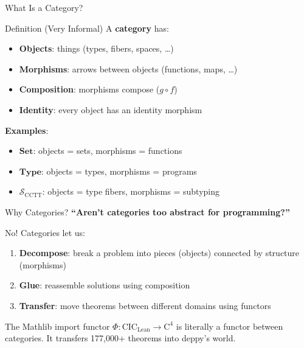 \documentclass[aspectratio=169,11pt]{beamer}
\newcommand{\Cfour}{\mathrm{C}^4}
\newcommand{\CIC}{\mathrm{CIC}}
\newcommand{\site}{\mathcal{S}}
\begin{document}
\begin{frame}{What Is a Category?}
\begin{block}{Definition (Very Informal)}
A \textbf{category} has:
\begin{itemize}
\item \textbf{Objects}: things (types, fibers, spaces, \ldots)
\item \textbf{Morphisms}: arrows between objects (functions, maps, \ldots)
\item \textbf{Composition}: morphisms compose ($g \circ f$)
\item \textbf{Identity}: every object has an identity morphism
\end{itemize}
\end{block}

\vspace{0.5em}
\textbf{Examples}:
\begin{itemize}
\item $\mathbf{Set}$: objects = sets, morphisms = functions
\item $\mathbf{Type}$: objects = types, morphisms = programs
\item $\site_{\mathrm{CCTT}}$: objects = type fibers, morphisms = subtyping
\end{itemize}
\end{frame}

\begin{frame}{Why Categories?}
\textbf{``Aren't categories too abstract for programming?''}

\vspace{0.5em}
No! Categories let us:
\begin{enumerate}
\item \textbf{Decompose}: break a problem into pieces (objects)
  connected by structure (morphisms)
\item \textbf{Glue}: reassemble solutions using composition
\item \textbf{Transfer}: move theorems between different domains
  using functors
\end{enumerate}

\vspace{0.5em}
The Mathlib import functor $\Phi : \CIC_{\mathrm{Lean}} \to \Cfour$
is literally a functor between categories.  It transfers 177,000+
theorems into deppy's world.
\end{frame}
\end{document}
